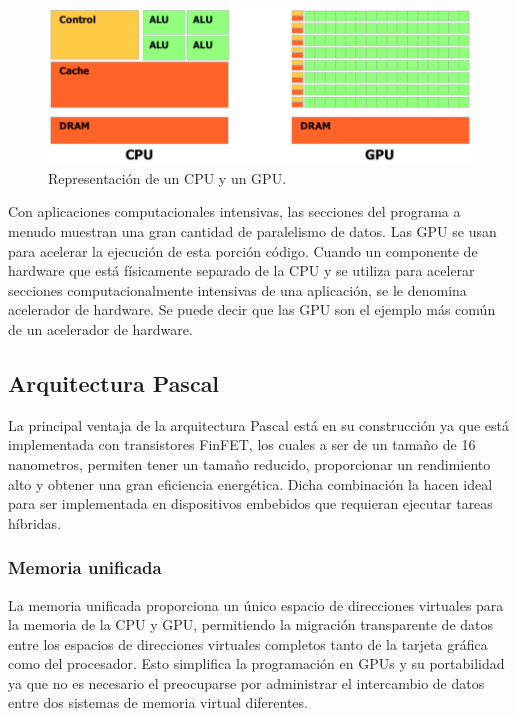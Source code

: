         \begin{figure}[ht]
      \centering
        \includegraphics[scale=0.35]{img/repCPUGPU}
        \caption{Representación de un CPU y un GPU\cite{NCUDA}.}
        \label{fig:gpgpu}
    \end{figure}
    
    \vspace{0.3cm}
    Con aplicaciones computacionales intensivas, las secciones del programa a menudo muestran una gran cantidad de paralelismo de datos. Las GPU se usan para acelerar la ejecución de esta porción código. Cuando un componente de hardware que está físicamente separado de la CPU y se utiliza para acelerar secciones computacionalmente intensivas de una aplicación, se le denomina acelerador de hardware. Se puede decir que las GPU son el ejemplo más común de un acelerador de hardware.

    \subsection{Arquitectura Pascal}

    La principal ventaja de la arquitectura Pascal está en su construcción ya que está implementada con transistores FinFET\cite{PasGPU}, los cuales a ser de un tamaño de 16 nanometros, permiten tener un tamaño reducido, proporcionar un rendimiento alto y obtener una gran eficiencia energética. Dicha combinación la hacen ideal para ser implementada en dispositivos embebidos que requieran ejecutar tareas híbridas.
     
    \subsubsection{Memoria unificada} \label{sec:MemUni}
     La memoria unificada proporciona un único espacio de direcciones virtuales para la memoria de la CPU y GPU, permitiendo la migración transparente de datos entre los espacios de direcciones virtuales completos tanto de la tarjeta gráfica como del procesador. Esto simplifica la programación en GPUs y su portabilidad ya que no es necesario el  preocuparse por administrar el intercambio de datos entre dos sistemas de memoria virtual diferentes\cite{WPNV}.
     
